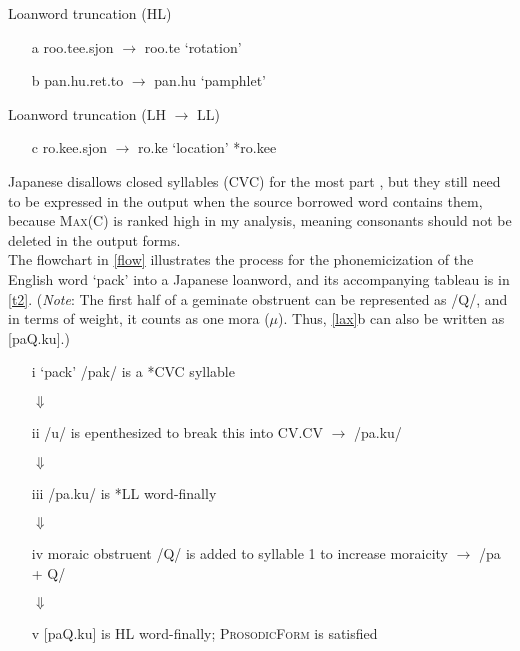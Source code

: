 \documentclass{article}
\begin{document}
\begin{exe}
    \ex
    \label{trunc}
    Loanword truncation (HL)
    \begin{itemize}
        \item [a] roo.tee.sjon $\rightarrow$ roo.te ‘rotation'
        \item [b] pan.hu.ret.to $\rightarrow$ pan.hu ‘pamphlet'
    \end{itemize}
    Loanword truncation (LH $\rightarrow$ LL)
    \begin{itemize}
        \item [c] ro.kee.sjon $\rightarrow$ ro.ke ‘location' \hspace{1cm} *ro.kee
    \end{itemize}
\end{exe}

Japanese disallows closed syllables (CVC) for the most part \citep[p. 7]{Shinohara1996}, but they still need to be expressed in the output when the source borrowed word contains them, because \textsc{Max(C)} is ranked high in my analysis, meaning consonants should not be deleted in the output forms. \\

The flowchart in \ref{flow} illustrates the process for the phonemicization of the English word ‘pack' into a Japanese loanword, and its accompanying tableau is in \ref{t2}. (\textit{Note}: The first half of a geminate obstruent can be represented as /Q/, and in terms of weight, it counts as one mora ($\mu$). Thus, \ref{lax}b can also be written as [paQ.ku].)

\begin{exe}
    \ex
    \label{flow}
    \begin{itemize}
        \item [i] ‘pack' /pak/ is a *CVC syllable
        \item [] \hspace{2cm} $\Downarrow$
        \item [ii] /u/ is epenthesized to break this into CV.CV $\rightarrow$ /pa.ku/
        \item [] \hspace{2cm} $\Downarrow$
        \item [iii] /pa.ku/ is *LL word-finally
        \item [] \hspace{2cm} $\Downarrow$
        \item [iv] moraic obstruent /Q/ is added to syllable 1 to increase moraicity $\rightarrow$ /pa + Q/
        \item [] \hspace{2cm} $\Downarrow$
        \item [v] [paQ.ku] is HL word-finally; \textsc{ProsodicForm} is satisfied
    \end{itemize}
\end{exe}
\end{document}
